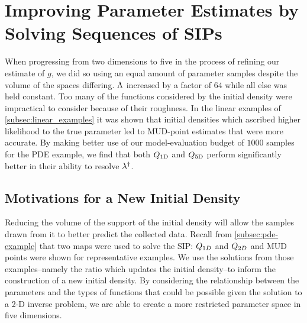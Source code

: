 \section{Improving Parameter Estimates by Solving Sequences of SIPs}\label{sec:mud-pde-sequence}
When progressing from two dimensions to five in the process of refining our estimate of $g$, we did so using an equal amount of parameter samples despite the volume of the spaces differing.
${\Lambda}$ increased by a factor of $64$ while all else was held constant.
Too many of the functions considered by the initial density were impractical to consider because of their roughness.
In the linear examples of \ref{subsec:linear_examples} it was shown that initial densities which ascribed higher likelihood to the true parameter led to MUD-point estimates that were more accurate.
By making better use of our model-evaluation budget of $1000$ samples for the PDE example, we find that both $Q_\text{1D}$ and $Q_\text{5D}$ perform significantly better in their ability to resolve $\lambda^\dagger$.


\subsection{Motivations for a New Initial Density}
Reducing the volume of the support of the initial density will allow the samples drawn from it to better predict the collected data.
Recall from \ref{subsec:pde-example} that two maps were used to solve the SIP: $Q_{1D}$ and $Q_{2D}$ and MUD points were shown for representative examples.
We use the solutions from those examples\---namely the ratio which updates the initial density\---to inform the construction of a new initial density.
By considering the relationship between the parameters and the types of functions that could be possible given the solution to a 2-D inverse problem, we are able to create a more restricted parameter space in five dimensions.

